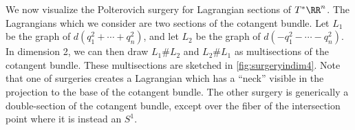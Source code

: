 

We now visualize the Polterovich surgery for Lagrangian sections of $T^*\RR^n$.
The Lagrangians which we consider are two sections of the cotangent bundle. 
Let $L_1$ be the graph of $d(q_1^2+ \cdots+ q_n^2)$, and let $L_2$ be the graph of $d(-q_1^2-\cdots -q_n^2)$. 
In dimension 2, we can then draw $L_1\# L_2$ and $L_2\# L_1$ as multisections of the cotangent bundle. 
These multisections are sketched in \cref{fig:surgeryindim4}.
Note that one of surgeries creates a Lagrangian which has a ``neck'' visible in the projection to the base of the cotangent bundle.
The other surgery is generically a double-section of the cotangent bundle, except over the fiber of the intersection point where it is instead an $S^1$.





 